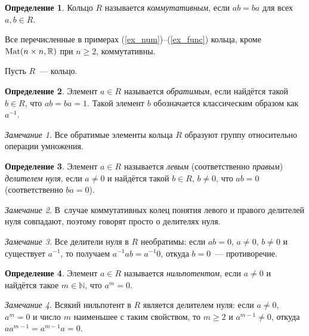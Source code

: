 \documentclass[a4paper, 12pt]{article}
\def\Mat{{\rm Mat}}%
\def\RR{{\mathbb R}}%
\def\NN{{\mathbb N}}%
\def\Mat{{\rm Mat}}
\theoremstyle{definition}
\newtheorem{definition}{Определение}
\theoremstyle{remark}
\newtheorem{remark}{Замечание}
\begin{document}
\begin{definition}
Кольцо $R$ называется {\it коммутативным}, если $ab=ba$ для всех
$a,b\in R$.
\end{definition}

Все перечисленные в примерах (\ref{ex_num})--(\ref{ex_func}) кольца,
кроме $\Mat(n\times n, \RR)$ при $n \geqslant 2$, коммутативны.

Пусть $R$~--- кольцо.

\begin{definition}
Элемент $a\in R$ называется {\it обратимым}, если найдётся такой
$b\in R$, что $ab=ba=1$. Такой элемент $b$ обозначается классическим образом как $a^{-1}$.
\end{definition}

\begin{remark}
Все обратимые элементы кольца $R$ образуют группу относительно
операции умножения.
\end{remark}

\begin{definition}
Элемент $a\in R$ называется \textit{левым} (соответственно
\textit{правым}) \textit{делителем нуля}, если $a \ne 0$ и найдётся
такой $b \in R$, $b\ne 0$, что $ab=0$ (соответственно $ba = 0$).
\end{definition}

\begin{remark}
В~случае коммутативных колец понятия левого и правого делителей нуля
совпадают, поэтому говорят просто о делителях нуля.
\end{remark}

\begin{remark}
Все делители нуля в $R$ необратимы: если $ab = 0$, $a \ne 0$, $b \ne
0$ и существует $a^{-1}$, то получаем $a^{-1}ab = a^{-1}0$, откуда
$b = 0$~--- противоречие.
\end{remark}

\begin{definition}
Элемент $a\in R$ называется {\it нильпотентом}, если $a \ne 0$ и
найдётся такое $m \in \NN$, что $a^m=0$.
\end{definition}

\begin{remark}
Всякий нильпотент в $R$ является делителем нуля: если $a \ne 0$,
$a^m = 0$ и число $m$ наименьшее с таким свойством, то $m \geqslant
2$ и $a^{m-1} \ne 0$, откуда $aa^{m-1} = a^{m-1}a = 0$.
\end{remark}

\end{document}
